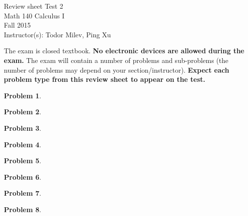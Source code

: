 \documentclass{article}
\newtheorem{problem}{Problem}
\begin{document}
\begin{center}
\Large
Review sheet Test 2 \\ Math 140 Calculus I \\ \normalsize Fall 2015 \\ Instructor(s): Todor Milev, Ping Xu
\end{center}



\noindent The exam is closed textbook. \textbf{No electronic devices are allowed during the exam. } The exam will contain a number of problems and sub-problems (the number of problems may depend on your section/instructor). \textbf{Expect each problem type from this review sheet to appear on the test.}%

\begin{problem}

\end{problem}

\begin{problem}

\end{problem}
\begin{problem}

\end{problem}


\begin{problem}

\end{problem}


\begin{problem}

\end{problem}

\begin{problem}

\end{problem}


\begin{problem}

\end{problem}



\begin{problem}

\end{problem}

\end{document}
